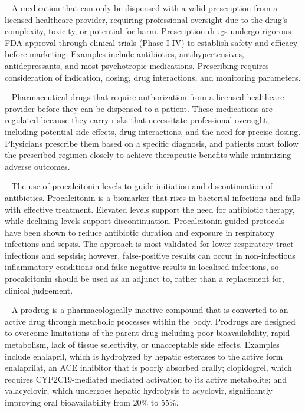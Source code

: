 -- A medication that can only be dispensed with a valid prescription from a licensed healthcare provider, requiring professional oversight due to the drug's complexity, toxicity, or potential for harm. Prescription drugs undergo rigorous FDA approval through clinical trials (Phase I-IV) to establish safety and efficacy before marketing. Examples include antibiotics, antihypertensives, antidepressants, and most psychotropic medications. Prescribing requires consideration of indication, dosing, drug interactions, and monitoring parameters.

-- Pharmaceutical drugs that require authorization from a licensed healthcare provider before they can be dispensed to a patient. These medications are regulated because they carry risks that necessitate professional oversight, including potential side effects, drug interactions, and the need for precise dosing. Physicians prescribe them based on a specific diagnosis, and patients must follow the prescribed regimen closely to achieve therapeutic benefits while minimizing adverse outcomes.

-- The use of procalcitonin levels to guide initiation and discontinuation of antibiotics. Procalcitonin is a biomarker that rises in bacterial infections and falls with effective treatment. Elevated levels support the need for antibiotic therapy, while declining levels support discontinuation. Procalcitonin-guided protocols have been shown to reduce antibiotic duration and exposure in respiratory infections and sepsis. The approach is most validated for lower respiratory tract infections and sepsisis; however, false-positive results can occur in non-infectious inflammatory conditions and false-negative results in localised infections, so procalcitonin should be used as an adjunct to, rather than a replacement for, clinical judgement.

-- A prodrug is a pharmacologically inactive compound that is converted to an active drug through metabolic processes within the body. Prodrugs are designed to overcome limitations of the parent drug including poor bioavailability, rapid metabolism, lack of tissue selectivity, or unacceptable side effects. Examples include enalapril, which is hydrolyzed by hepatic esterases to the active form enalaprilat, an ACE inhibitor that is poorly absorbed orally; clopidogrel, which requires CYP2C19-mediated mediated activation to its active metabolite; and valacyclovir, which undergoes hepatic hydrolysis to acyclovir, significantly improving oral bioavailability from 20\% to 55\%.

